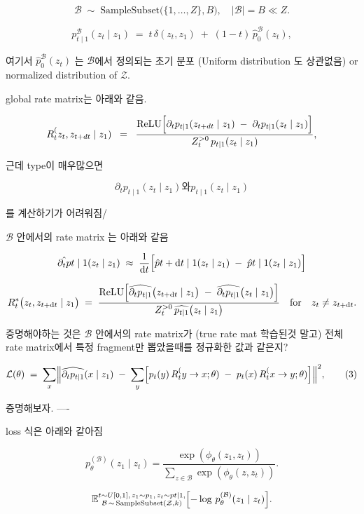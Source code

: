 \[
\mathcal{B}
\;\sim\;
\text{SampleSubset}\bigl(\{1,\dots,Z\}, B\bigr),
\quad
|\mathcal{B}| = B \ll Z.
\]

\[
p_{t\mid 1}^\mathcal{B}(z_t \mid z_1)
\;=\;
t\,\delta(z_t, z_1)
\;+\;
(1 - t)\,\hat{p}_0^\mathcal{B}(z_t),
\] 

여기서 $\hat{p}_0^\mathcal{B}(z_t)$ 는 $\mathcal{B}$에서 정의되는 초기 분포 (Uniform distribution 도 상관없음) or normalized distribution of $\mathcal{Z}$. 

global rate matrix는 아래와 같음.


\[
R_t^(z_t,z_{t+dt}\mid z_1)
\;\;=\;\;
\frac{\mathrm{ReLU}\Bigl[\partial_t p_{t\mid 1}(z_{t+dt}\mid z_1) \;-\; \partial_t p_{t\mid 1}(z_t\mid z_1)\Bigr]}
{Z_t^{>0}\, p_{t\mid 1}(z_t \mid z_1)},
\]

근데 type이 매우많으면 

\[
 \partial_t p_{t\mid 1}(z_t \mid z_1)와 p_{t\mid 1}(z_t \mid z_1)
\]

를 계산하기가 어려워짐/

$\mathcal{B}$ 안에서의 rate matrix 는 아래와 같음

\[
\hat{\partial_t p}{t\mid 1}(z_t \mid z_1)
\;\approx\;
\frac{1}{\mathrm{d}t}
\Bigl[
\hat{p}{t+\mathrm{d}t\mid 1}(z_t \mid z_1)
\;-\;
\hat{p}{t\mid 1}(z_t \mid z_1)
\Bigr]
\]

\[
R_t^*\bigl(z_t, z_{t+\mathrm{d}t} \mid z_1\bigr)
\;=\;
\frac{
  \mathrm{ReLU}\Bigl[
    \widehat{\partial_t p_{t\mid 1}}\bigl(z_{t+\mathrm{d}t}\mid z_1\bigr)
    \;-\;
    \widehat{\partial_t p_{t\mid 1}}\bigl(z_t\mid z_1\bigr)
  \Bigr]
}{
  Z_t^{>0}\,\widehat{p_{t\mid 1}}\bigl(z_t\mid z_1\bigr)
}
\quad
\text{for}
\quad
z_t \neq z_{t+\mathrm{d}t}.
\]

증명해야하는 것은 $\mathcal{B}$ 안에서의 rate matrix가 (true rate mat 학습된것 말고) 전체 rate matrix에서 특정 fragment만 뽑았을때를 정규화한 값과 같은지?


\[
\mathcal{L}(\theta)
\;=\;
\sum_{x}
\Bigl\|
\widehat{\partial_t p_{t\mid 1}}(x \mid z_1)
\;-\;
\sum_{y}\Bigl[
p_t(y)\, R_t^(y \to x;\theta)
\;-\;
p_t(x)\, R_t^(x \to y;\theta)
\Bigr]
\Bigr\|^2,
\tag{3}
\]

증명해보자. ----

loss 식은 아래와 같아짐

\[
p_{\theta}^{(\mathcal{B})}(z_1 \mid z_t)=
\frac{\exp(\phi_\theta(z_1, z_t))}{
\sum_{z\in \mathcal{B}} \exp(\phi_\theta(z, z_t))
}.
\]


\[
\mathbb{E}{
\substack{
t \sim U[0,1],\,
z_1 \sim p_1,\,
z_t \sim p{t\mid 1},\\
\mathcal{B} \,\sim\, \mathrm{SampleSubset}(\mathcal{Z}, k)
}
}
\Bigl[
-\log\, p_{\theta}^{(\mathcal{B})}(z_1 \mid z_t)
\Bigr].
\]

